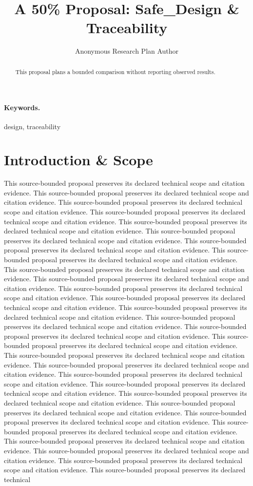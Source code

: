 \documentclass{article}
\title{A 50\% Proposal: Safe\_Design \& Traceability}
\author{Anonymous Research Plan Author}
\begin{document}
\maketitle
\begin{abstract}
This proposal plans a bounded comparison without reporting observed results.
\end{abstract}
\paragraph{Keywords.} design, traceability
\section{Introduction \& Scope}
This source-bounded proposal preserves its declared technical scope and citation evidence. This source-bounded proposal preserves its declared technical scope and citation evidence. This source-bounded proposal preserves its declared technical scope and citation evidence. This source-bounded proposal preserves its declared technical scope and citation evidence. This source-bounded proposal preserves its declared technical scope and citation evidence. This source-bounded proposal preserves its declared technical scope and citation evidence. This source-bounded proposal preserves its declared technical scope and citation evidence. This source-bounded proposal preserves its declared technical scope and citation evidence. This source-bounded proposal preserves its declared technical scope and citation evidence. This source-bounded proposal preserves its declared technical scope and citation evidence. This source-bounded proposal preserves its declared technical scope and citation evidence. This source-bounded proposal preserves its declared technical scope and citation evidence. This source-bounded proposal preserves its declared technical scope and citation evidence. This source-bounded proposal preserves its declared technical scope and citation evidence. This source-bounded proposal preserves its declared technical scope and citation evidence. This source-bounded proposal preserves its declared technical scope and citation evidence. This source-bounded proposal preserves its declared technical scope and citation evidence. This source-bounded proposal preserves its declared technical scope and citation evidence. This source-bounded proposal preserves its declared technical scope and citation evidence. This source-bounded proposal preserves its declared technical scope and citation evidence. This source-bounded proposal preserves its declared technical scope and citation evidence. This source-bounded proposal preserves its declared technical scope and citation evidence. This source-bounded proposal preserves its declared technical scope and citation evidence. This source-bounded proposal preserves its declared technical scope and citation evidence. This source-bounded proposal preserves its declared technical scope and citation evidence. This source-bounded proposal preserves its declared technical scope and citation evidence. This source-bounded proposal preserves its declared technical scope and citation evidence. This source-bounded proposal preserves its declared technical 
\end{document}
